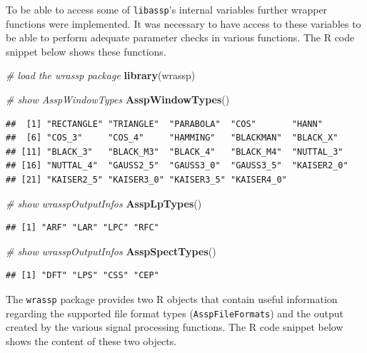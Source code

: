 \documentclass[]{book}
\newenvironment{Shaded}{\begin{snugshade}}{\end{snugshade}}
\newcommand{\CommentTok}[1]{\textcolor[rgb]{0.56,0.35,0.01}{\textit{#1}}}
\newcommand{\KeywordTok}[1]{\textcolor[rgb]{0.13,0.29,0.53}{\textbf{#1}}}
\newcommand{\NormalTok}[1]{#1}
\theoremstyle{definition}
\theoremstyle{definition}
\theoremstyle{definition}
\theoremstyle{remark}
\begin{document}
To be able to access some of \texttt{libassp}'s internal variables
further wrapper functions were implemented. It was necessary to have
access to these variables to be able to perform adequate parameter
checks in various functions. The R code snippet below shows these
functions.

\begin{Shaded}
\begin{Highlighting}[]
\CommentTok{# load the wrassp package}
\KeywordTok{library}\NormalTok{(wrassp)}

\CommentTok{# show AsspWindowTypes}
\KeywordTok{AsspWindowTypes}\NormalTok{()}
\end{Highlighting}
\end{Shaded}

\begin{verbatim}
##  [1] "RECTANGLE" "TRIANGLE"  "PARABOLA"  "COS"       "HANN"     
##  [6] "COS_3"     "COS_4"     "HAMMING"   "BLACKMAN"  "BLACK_X"  
## [11] "BLACK_3"   "BLACK_M3"  "BLACK_4"   "BLACK_M4"  "NUTTAL_3" 
## [16] "NUTTAL_4"  "GAUSS2_5"  "GAUSS3_0"  "GAUSS3_5"  "KAISER2_0"
## [21] "KAISER2_5" "KAISER3_0" "KAISER3_5" "KAISER4_0"
\end{verbatim}

\begin{Shaded}
\begin{Highlighting}[]
\CommentTok{# show wrasspOutputInfos}
\KeywordTok{AsspLpTypes}\NormalTok{()}
\end{Highlighting}
\end{Shaded}

\begin{verbatim}
## [1] "ARF" "LAR" "LPC" "RFC"
\end{verbatim}

\begin{Shaded}
\begin{Highlighting}[]
\CommentTok{# show wrasspOutputInfos}
\KeywordTok{AsspSpectTypes}\NormalTok{()}
\end{Highlighting}
\end{Shaded}

\begin{verbatim}
## [1] "DFT" "LPS" "CSS" "CEP"
\end{verbatim}

The \texttt{wrassp} package provides two R objects that contain useful
information regarding the supported file format types
(\texttt{AsspFileFormats}) and the output created by the various signal
processing functions. The R code snippet below shows the content of
these two objects.
\end{document}
